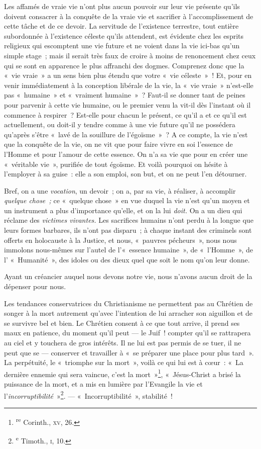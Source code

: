 \documentclass[french,twoside]{book} %
\begin{document}
Les affamés de vraie vie n’ont plus aucun pouvoir  sur leur vie présente qu’ils doivent consacrer à la conquête de la vraie vie et sacrifier à l’accomplissement de cette tâche et de ce devoir. La servitude de l’existence terrestre, tout entière subordonnée à l’existence céleste qu’ils attendent, est évidente chez les esprits religieux qui escomptent une vie future et ne voient dans la vie ici-bas qu’un simple stage ; mais il serait très faux de croire à moins de renoncement chez ceux qui se sont en apparence le plus affranchi des dogmes. Comprenez donc que la « vie vraie » a un sens bien plus étendu que votre « vie céleste » ! Et, pour en venir immédiatement à la conception libérale de la vie, la « vie vraie » n’est-elle pas « humaine » et « vraiment humaine » ? Faut-il se donner tant de peines pour parvenir à cette vie humaine, ou le premier venu la vit-il dès l’instant où il commence à respirer ? Est-elle pour chacun le présent, ce qu’il a et ce qu’il est actuellement, ou doit-il y tendre comme à une vie future qu’il ne possédera qu’après s’être « lavé de la souillure de l’égoïsme » ? A ce compte, la vie n’est que la conquête de la vie, on ne vit que pour faire vivre en soi l’essence de l’Homme et pour l’amour de cette essence. On n’a sa vie que pour en créer une « véritable vie », purifiée de tout égoïsme. Et voilà pourquoi on hésite à l’employer à sa guise : elle a son emploi, son but, et on ne peut l’en détourner.\par
Bref, on a une \emph{vocation}, un devoir ; on a, par sa vie, à réaliser, à accomplir \emph{quelque chose ;} ce « quelque chose » en vue duquel la vie n’est qu’un moyen et un instrument a plus d’importance qu’elle, et on la lui \emph{doit.} On a un dieu qui réclame des \emph{victimes vivantes.} Les sacrifices humains n’ont perdu à la longue que leurs formes barbares, ils n’ont pas disparu ; à chaque instant des criminels sont offerts en holocauste à la Justice, et nous, « pauvres pécheurs », nous nous immolons nous-mêmes sur l’autel de l’« essence humaine », de « l’Homme », de l’ « Humanité », des idoles ou des dieux quel que soit le nom qu’on leur donne.\par
 Ayant un créancier auquel nous devons notre vie, nous n’avons aucun droit de la dépenser pour nous.\par
Les tendances conservatrices du Christianisme ne permettent pas au Chrétien de songer à la mort autrement qu’avec l’intention de lui arracher son aiguillon et de se survivre bel et bien. Le Chrétien consent à ce que tout arrive, il prend ses maux en patience, du moment qu’il peut — le Juif ! compter qu’il se rattrapera au ciel et y touchera de gros intérêts. Il ne lui est pas permis de se tuer, il ne peut que se — conserver et travailler à « se préparer une place pour plus tard ». La perpétuité, le « triomphe sur la mort », voilà ce qui lui est à cœur : « La dernière ennemie qui sera vaincue, c’est la mort »\footnote{ \textsuperscript{re} Corinth., {\scshape xv}, 26.
 }, « Jésus-Christ a brisé la puissance de la mort, et a mis en lumière par l’Evangile la vie et l’\emph{incorruptibilité} »\footnote{ \textsuperscript{e} Timoth., {\scshape i}, 10.
 }. — « Incorruptibilité », stabilité !\par
\end{document}
